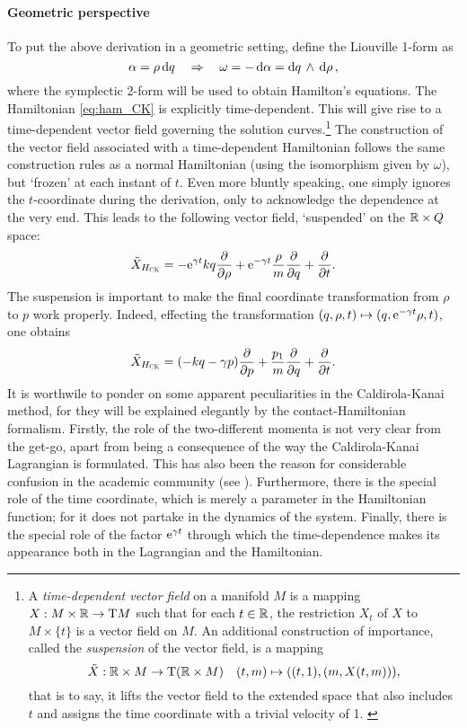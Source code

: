 \paragraph{Geometric perspective}
To put the above derivation in a geometric setting, define the Liouville 1-form as
$$ \alpha = \rho\dd{q} \quad \Rightarrow \quad \omega = -\dd{\alpha} =  \dd{q}\,\wedge\,\dd{\ensuremath{\rho}} ,$$
where the symplectic 2-form will be used to obtain Hamilton's equations. The Hamiltonian \cref{eq:ham_CK} is explicitly time-dependent. This will give rise to a time-dependent vector field governing the solution curves.\footnote
{A \emph{time-dependent vector field} on a manifold $M$ is a mapping $X: M\times\mathbb{R} \to \mathrm{T}M$ such that for each $t \in \mathbb{R}$, the restriction $X_t$ of $X$ to $M \times \{t\}$ is a vector field on $M$. \cite{Libermann1987} An additional construction of importance, called the \emph{suspension} of the vector field, is a mapping $$ \tilde{X}: \mathbb{R} \times M \to \mathrm{T}(\mathbb{R} \times M) \quad (t, m) \mapsto ((t, 1), (m, X(t, m))),$$ that is to say, it lifts the vector field to the extended space that also includes $t$ and assigns the time coordinate with a trivial velocity of 1. \cite{Abraham1978}}
The construction of the vector field associated with a time-dependent Hamiltonian follows the same construction rules as a normal Hamiltonian (using the isomorphism given by $\omega$), but `frozen' at each instant of $t$. Even more bluntly speaking, one simply ignores the $t$-coordinate during the derivation, only to acknowledge the dependence at the very end. This leads to the following vector field, `suspended' on the $\mathbb{R}\times Q$ space:
$$ \tilde{X}_{H_\text{\tiny{\textsc{CK}}}} = -\mathrm{e}^{\gamma t}kq\pdv{}{\ensuremath{\rho}} + \mathrm{e}^{-\gamma t}\frac{\rho}{m}\pdv{}{q} + \pdv{}{t}.$$
The suspension is important to make the final coordinate transformation from $\rho$ to $p$ work properly. Indeed, effecting the transformation $(q, \rho, t) \mapsto (q, \mathrm{e}^{-\gamma t}\rho, t)$, one obtains
$$ \tilde{X}_{H_\text{\tiny{\textsc{CK}}}} = \qty(-kq - \gamma p)\pdv{}{p} + \frac{p_1}{m}\pdv{}{q} + \pdv{}{t}.$$
It is worthwile to ponder on some apparent peculiarities in the Caldirola-Kanai method, for they will be explained elegantly by the contact-Hamiltonian formalism. Firstly, the role of the two-different momenta is not very clear from the get-go, apart from being a consequence of the way the Caldirola-Kanai Lagrangian is formulated. This has also been the reason for considerable confusion in the academic community (see \citet{Schuch1997}). Furthermore, there is the special role of the time coordinate, which is merely a parameter in the Hamiltonian function; for it does not partake in the dynamics of the system. Finally, there is the special role of the factor $\mathrm{e}^{\gamma t}$ through which the time-dependence makes its appearance both in the Lagrangian and the Hamiltonian.

